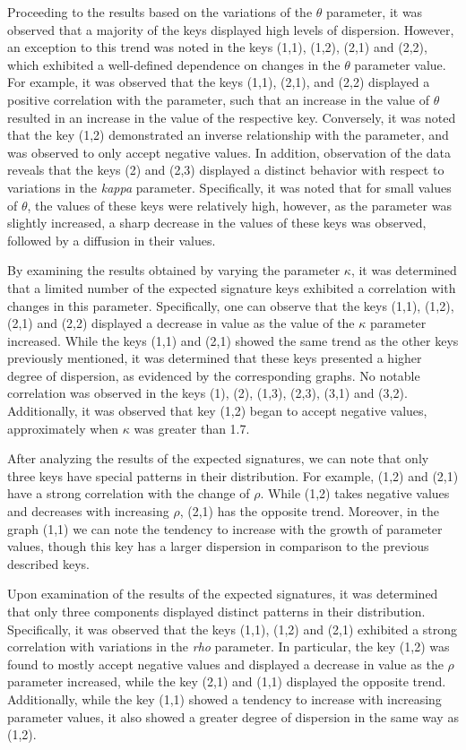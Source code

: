\documentclass[12pt,a4paper]{report}
\theoremstyle{definition}
\begin{document}
Proceeding to the results based on the variations of the $\theta$ parameter, it was observed that a majority of the keys displayed high levels of dispersion. However, an exception to this trend was noted in the keys (1,1), (1,2), (2,1) and (2,2), which exhibited a well-defined dependence on changes in the $\theta$ parameter value. For example, it was observed that the keys (1,1), (2,1), and (2,2) displayed a positive correlation with the parameter, such that an increase in the value of $\theta$ resulted in an increase in the value of the respective key. Conversely, it was noted that the key (1,2) demonstrated an inverse relationship with the parameter, and was observed to only accept negative values. In addition, observation of the data reveals that the keys (2) and (2,3) displayed a distinct behavior with respect to variations in the \textit{kappa} parameter. Specifically, it was noted that for small values of $\theta$, the values of these keys were relatively high, however, as the parameter was slightly increased, a sharp decrease in the values of these keys was observed, followed by a diffusion in their values.

By examining the results obtained by varying the parameter $\kappa$, it was determined that a limited number of the expected signature keys exhibited a correlation with changes in this parameter. Specifically, one can observe that the keys (1,1), (1,2), (2,1) and (2,2) displayed a decrease in value as the value of the $\kappa$ parameter increased. While the keys (1,1) and (2,1) showed the same trend as the other keys previously mentioned, it was determined that these keys presented a higher degree of dispersion, as evidenced by the corresponding graphs. No notable correlation was observed in the keys (1), (2), (1,3), (2,3), (3,1) and (3,2). Additionally, it was observed that key (1,2) began to accept negative values, approximately when $\kappa$ was greater than 1.7.

After analyzing the results of the expected signatures, we can note that only three keys have special patterns in their distribution. For example, (1,2) and (2,1) have a strong correlation with the change of $\rho$. While (1,2) takes negative values and decreases with increasing $\rho$, (2,1) has the opposite trend. Moreover, in the graph (1,1) we can note the tendency to increase with the growth of parameter values, though this key has a larger dispersion in comparison to the previous described keys.

Upon examination of the results of the expected signatures, it was determined that only three components displayed distinct patterns in their distribution. Specifically, it was observed that the keys (1,1), (1,2) and (2,1) exhibited a strong correlation with variations in the \textit{rho} parameter. In particular, the key (1,2) was found to mostly accept negative values and displayed a decrease in value as the $\rho$ parameter increased, while the key (2,1) and (1,1) displayed the opposite trend. Additionally, while the key (1,1) showed a tendency to increase with increasing parameter values, it also showed a greater degree of dispersion in the same way as (1,2).
\end{document}

